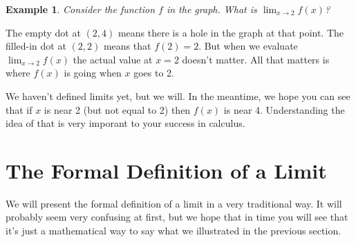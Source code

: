 \documentclass[11pt]{book}
\newtheorem{example}{Example}
\numberwithin{example}{chapter}
\begin{document}
\begin{example} Consider the function $f$ in the graph. What is $\lim_{x\to 2} f(x)$?

\begin{center}


\end{center}

\end{example}


 The empty dot at $(2,4)$ means there is a hole in the graph at that point.  The filled-in dot at $(2,2)$ means that $f(2)=2$.  But when we evaluate $\lim_{x\to 2} f(x)$ the actual value at $x=2$ doesn't matter.  All that matters is where $f(x)$ is going when $x$ goes to 2.
 
 We haven't defined limits yet, but we will.  In the meantime, we hope you can see that if $x$ is near 2 (but not equal to 2) then $f(x)$ is near 4.  Understanding the idea of that is very imporant to your success in calculus.    

\section{The Formal Definition of a Limit}

We will present the formal definition of a limit in a very traditional way.  It will probably seem very confusing at first, but we hope that in time you will see that it's just a mathematical way to say what we illustrated in the previous section. 
\end{document}
